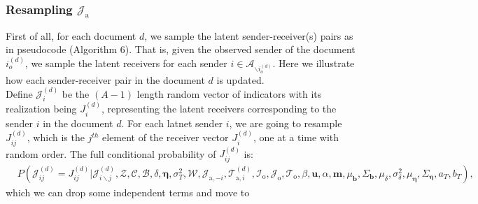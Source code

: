    \subsubsection{Resampling $\mathcal{J}_{\mbox{a}}$} \label{subsec: Data augmentation}
   First of all, for each document $d$, we sample the latent sender-receiver(s) pairs as in pseudocode (Algorithm 6). That is, given the observed sender of the document $i_o^{(d)}$, we sample the latent receivers for each sender $i \in \mathcal{A}_{\backslash i_o^{(d)}}$. Here we illustrate how each sender-receiver pair in the document $d$ is updated.\\\newline
   Define ${\mathcal{J}}^{(d)}_{i}$ be the $(A-1)$ length random vector of indicators with its realization being $J^{(d)}_{i}$, representing the latent receivers corresponding to the sender $i$ in the document $d$. For each latnet sender $i$, we are going to resample ${J}^{(d)}_{ij}$, which is the $j^{th}$ element of the receiver vector ${J}^{(d)}_{i}$, one at a time with random order. The full conditional probability of ${J}^{(d)}_{ij}$ is:
   \begin{equation}
   \begin{aligned}
   & P(\mathcal{J}^{(d)}_{ij} = {J}^{(d)}_{ij}|\mathcal{J}^{(d)}_{i\backslash j},  \mathcal{Z}, \mathcal{C},   \mathcal{B}, \delta, \boldsymbol{\eta}, \sigma_T^2, \mathcal{W},  \mathcal{J}_{\mbox{a}, -i}, \mathcal{T}^{(d)}_{\mbox{a}, i}, \mathcal{I}_{\mbox{o}}, \mathcal{J}_{\mbox{o}}, \mathcal{T}_{\mbox{o}}, \beta, \boldsymbol{u}, \alpha, \boldsymbol{m},  \mu_{\boldsymbol{b}}, \Sigma_{\boldsymbol{b}}, \mu_\delta, \sigma^2_\delta, \mu_{\boldsymbol{\eta}}, \Sigma_{\boldsymbol{\eta}}, a_T, b_T),
   \end{aligned}
   \end{equation}
   which we can drop some independent terms and move to 
